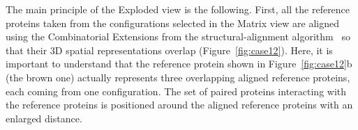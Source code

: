 \documentclass{bmcart}
\def\ExpView {Exploded view\xspace}
\def\MatView {Matrix view\xspace}
\begin{document}


The main principle of the \ExpView is the following.
First, all the reference proteins taken from the configurations selected in the \MatView are aligned using the Combinatorial Extensions from the structural-alignment algorithm~\cite{Shindyalov1998} so that their 3D spatial representations overlap (Figure~\ref{fig:case12}). 
Here, it is important to understand that the reference protein shown in Figure~\ref{fig:case12}b (the brown one) actually represents three overlapping aligned reference proteins, each coming from one configuration.
The set of paired proteins interacting with the reference proteins is positioned around the aligned reference proteins with an enlarged distance.

\end{document}
